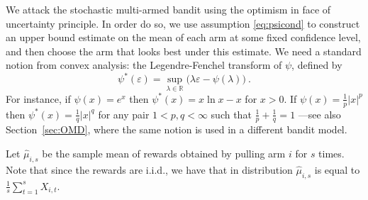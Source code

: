 \documentclass[11pt]{hackednow}
\newcommand{\R}{\mathbb{R}}
\def\ds1{\mathds{1}}
\renewcommand{\epsilon}{\varepsilon}
\newcommand{\wh}{\widehat}
\begin{document}
We attack the stochastic multi-armed bandit using the optimism in face of uncertainty principle. In order do so, we use assumption \eqref{eq:psicond} to construct an upper bound estimate on the mean of each arm at some fixed confidence level, and then choose the arm that looks best under this estimate. We need a standard notion from convex analysis: the Legendre-Fenchel transform of $\psi$, defined by
\[
    \psi^*(\epsilon) = \sup_{\lambda \in \R} \bigl(\lambda \epsilon - \psi(\lambda)\bigr)~.
\]
For instance, if $\psi(x) = e^x$ then $\psi^*(x) = x\ln x - x$ for $x > 0$. If $\psi(x) = \frac{1}{p}|x|^p$ then $\psi^*(x) = \frac{1}{q}|x|^q$ for any pair $1 < p,q < \infty$ such that $\frac{1}{p} + \frac{1}{q} = 1$ ---see also Section~\ref{sec:OMD}, where the same notion is used in a different bandit model. 

Let $\wh{\mu}_{i,s}$ be the sample mean of rewards obtained by pulling arm $i$ for $s$ times. Note that since the rewards are i.i.d., we have that in distribution $\wh{\mu}_{i,s}$ is equal to $\frac{1}{s} \sum_{t=1}^s X_{i,t}$.
\end{document}
